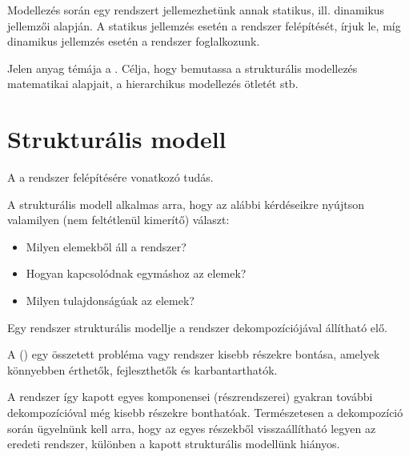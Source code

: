 

Modellezés során egy rendszert jellemezhetünk annak statikus, ill. dinamikus jellemzői alapján. A statikus jellemzés esetén a rendszer felépítését,  írjuk le, míg dinamikus jellemzés esetén a rendszer  foglalkozunk.

Jelen anyag témája a . Célja, hogy bemutassa a strukturális modellezés matematikai alapjait, a hierarchikus modellezés ötletét stb.

\section{Strukturális modell}

\begin{definicio}
A  a rendszer felépítésére vonatkozó tudás.
\end{definicio}

A strukturális modell alkalmas arra, hogy az alábbi kérdéseikre nyújtson valamilyen (nem feltétlenül kimerítő) választ:

\begin{itemize}
\item Milyen elemekből áll a rendszer?
\item Hogyan kapcsolódnak egymáshoz az elemek?
\item Milyen tulajdonságúak az elemek?
\end{itemize}

Egy rendszer strukturális modellje a rendszer dekompozíciójával állítható elő.

\begin{definicio}
	A  () egy összetett probléma vagy rendszer kisebb részekre bontása, amelyek könnyebben érthetők, fejleszthetők és karbantarthatók.
\end{definicio}


A rendszer így kapott egyes komponensei (részrendszerei) gyakran további dekompozícióval még kisebb részekre bonthatóak. Természetesen a dekompozíció során ügyelnünk kell arra, hogy az egyes részekből visszaállítható legyen az eredeti rendszer, különben a kapott strukturális modellünk hiányos.

